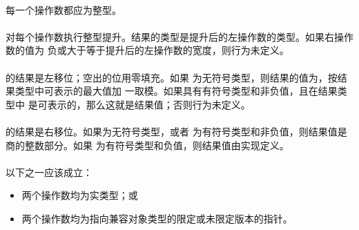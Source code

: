 {\constraint
\paragraph{}
每一个操作数都应为整型。

\semantic
\paragraph{}
对每个操作数执行整型提升。结果的类型是提升后的左操作数的类型。如果右操作数的值为
负或大于等于提升后的左操作数的宽度，则行为未定义。

\paragraph{}
的结果是左移位；空出的位用零填充。如果
为无符号类型，则结果的值为，按结果类型中可表示的最大值加
一取模。如果具有有符号类型和非负值，且在结果类型中
是可表示的，那么这就是结果值；否则行为未定义。

\paragraph{}
的结果是右移位。如果为无符号类型，或者
为有符号类型和非负值，则结果值是商的整数部分。如果
为有符号类型和负值，则结果值由实现定义。

\syntax
\paragraph{}

\constraint
\paragraph{}
以下之一应该成立：
\begin{itemize}
  \item{两个操作数均为实类型；或}
  \item{两个操作数均为指向兼容对象类型的限定或未限定版本的指针。}
\end{itemize}

}
